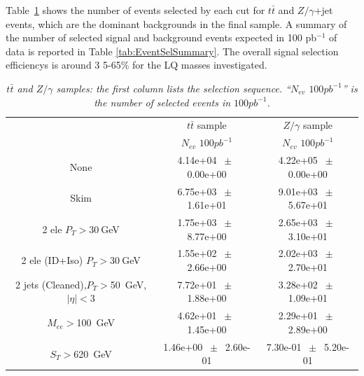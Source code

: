 \documentclass{cmspaper}
\begin{document}
\begin{linenumbers}
 
Table~\ref{tab:selection_effic_ttbar} shows the number of events selected by each cut 
for $t\bar{t}$ and $Z/\gamma$+jet events, which are the dominant backgrounds in the final sample. 
A summary of the number of selected signal and background events expected in 100 pb$^{-1}$ of data 
is reported in Table \ref{tab:EventSelSummary}. 
The overall signal selection efficiencys is around 3
5-65\% for the LQ masses investigated. 


\begin{table}[htbp]
\begin{center}
\begin{tabular}{|c| |c|c|}
\hline
\hline
 & $t\bar{t}$ sample  & $Z/\gamma$ sample\\
 & $N_{ev}$ $100pb^{-1}$ & $N_{ev}$ $100pb^{-1}$ \\
  
\hline
\hline
None       &        4.14e+04       $~\pm~$       0.00e+00  &        4.22e+05       $~\pm~$       0.00e+00           \\       
Skim       &        6.75e+03       $~\pm~$       1.61e+01 &        9.01e+03       $~\pm~$       5.67e+01       \\       
2 ele $P_T>30~$GeV &        1.75e+03       $~\pm~$       8.77e+00&        2.65e+03       $~\pm~$       3.10e+01     \\       
2 ele (ID+Iso) $P_T>30~$GeV &        1.55e+02       $~\pm~$       2.66e+00 &        2.02e+03       $~\pm~$       2.70e+01     \\       
2 jets (Cleaned),$P_T>$50~GeV,$|\eta|<$3 &        7.72e+01       $~\pm~$       1.88e+00 &        3.28e+02       $~\pm~$       1.09e+01        \\       
$M_{ee}>$100~GeV &        4.62e+01       $~\pm~$       1.45e+00 &        2.29e+01       $~\pm~$       2.89e+00        \\       
$S_T>$620~GeV &        1.46e+00       $~\pm~$       2.60e-01 &        7.30e-01  $~\pm~$       5.20e-01        \\       
\hline
\end{tabular}
\end{center}
\caption{\small \sl $t\bar{t}$ and $Z/\gamma$ samples: the first column lists the selection sequence. ``$N_{ev}$  $100pb^{-1}$'' is the number of selected events in $100pb^{-1}$.}
\label{tab:selection_effic_ttbar}
\end{table}



\end{linenumbers}
\end{document}
